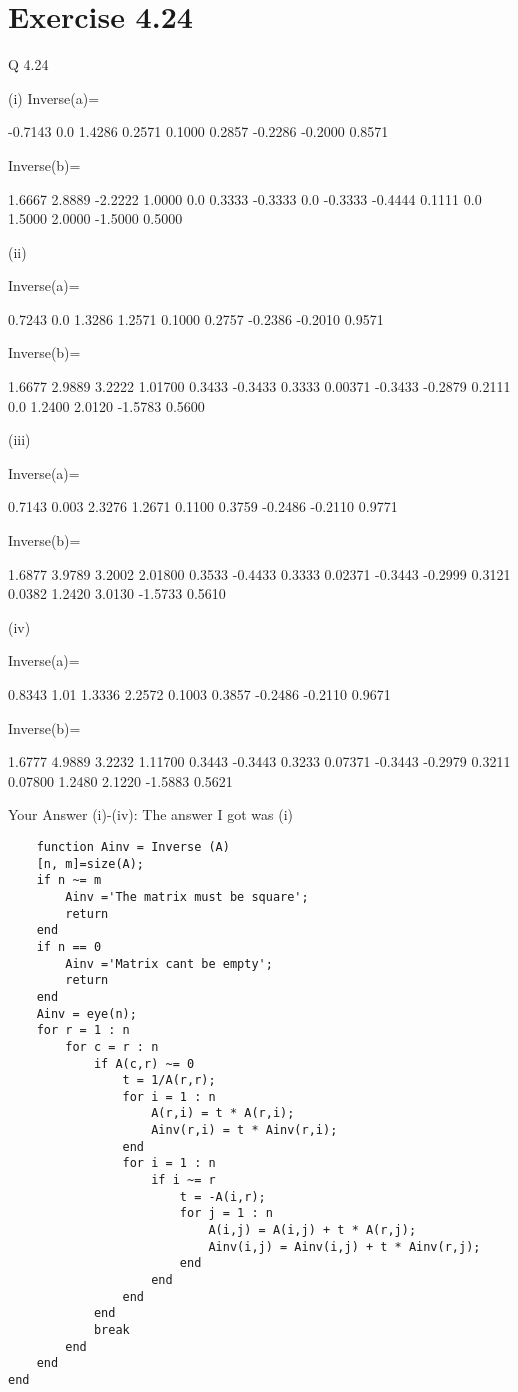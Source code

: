 \documentclass[12pt,a4paper]{report}
\begin{document}
\section{Exercise 4.24}
Q 4.24

    (i) Inverse(a)=

	-0.7143 	0.0 		1.4286
0.2571 		0.1000 		0.2857
-0.2286 	-0.2000 	0.8571


	Inverse(b)=

1.6667 		2.8889 		-2.2222 	1.0000
0.0 			0.3333 		-0.3333 	0.0
-0.3333 		-0.4444 	0.1111 		0.0
1.5000 		2.0000 		-1.5000 	0.5000


(ii)

Inverse(a)=

	0.7243		 0.0 		1.3286
1.2571 		0.1000 		0.2757
-0.2386 	-0.2010 	0.9571


	 Inverse(b)=

1.6677 		2.9889  		3.2222 		1.01700
 0.3433 		-0.3433 	0.3333		0.00371
-0.3433 		-0.2879 	0.2111 		0.0	
1.2400 		2.0120 		-1.5783 	0.5600


(iii)

Inverse(a)=

	0.7143		 0.003 		2.3276
1.2671 		0.1100 		0.3759
-0.2486 	-0.2110 	0.9771


Inverse(b)=

1.6877 		3.9789  		3.2002 		2.01800
 0.3533 		-0.4433 	0.3333		0.02371
-0.3443 		-0.2999 	0.3121 		0.0382	
1.2420 		3.0130 		-1.5733 	0.5610


(iv)

Inverse(a)=

	0.8343		 1.01 		1.3336
2.2572 		0.1003 		0.3857
-0.2486 	-0.2110 	0.9671


Inverse(b)=

1.6777 		4.9889  		3.2232 		1.11700
 0.3443 		-0.3443 	0.3233		0.07371
-0.3443 		-0.2979 	0.3211 		0.07800	
1.2480 		2.1220 		-1.5883 	0.5621


Your Answer (i)-(iv):
The answer I got was (i)
\begin{lstlisting}
	function Ainv = Inverse (A)
    [n, m]=size(A); 
    if n ~= m 
        Ainv ='The matrix must be square';
        return
    end
    if n == 0 
        Ainv ='Matrix cant be empty';
        return
    end
    Ainv = eye(n);
    for r = 1 : n
        for c = r : n
            if A(c,r) ~= 0
                t = 1/A(r,r);
                for i = 1 : n
                    A(r,i) = t * A(r,i);
                    Ainv(r,i) = t * Ainv(r,i); 
                end
                for i = 1 : n
                    if i ~= r 
                        t = -A(i,r);
                        for j = 1 : n
                            A(i,j) = A(i,j) + t * A(r,j);
                            Ainv(i,j) = Ainv(i,j) + t * Ainv(r,j);
                        end
                    end
                end
            end
            break
        end
    end
end
\end{lstlisting}
\end{document}
